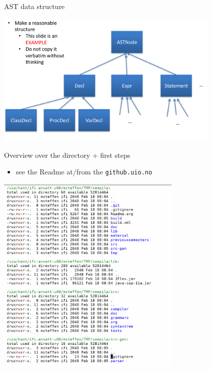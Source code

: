 \documentclass{beamer}
\begin{document}
\begin{frame}[label={sec:org80adcdb}]{AST data structure}

\begin{center}
 \includegraphics[width=0.8\textwidth]{figures/snaps/astclasses}
\end{center}
\end{frame}




\begin{frame}[label={sec:orgee6e378},fragile]{Overview over the directory + first steps}
 \begin{itemize}
\item see the Readme at/from the \texttt{github.uio.no}
\end{itemize}


\includegraphics[width=0.66\textwidth]{figures/snaps/directorystruct}
\end{frame}
\end{document}

